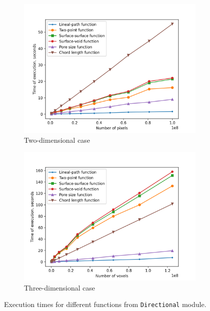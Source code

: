 \documentclass[reprint,amsmath,amssymb,aps,pre]{revtex4-1}
\newcommand{\code}[1]{\colorbox{light-gray}{\texttt{#1}}}
\begin{document}
\onecolumngrid
\begin{figure}[t]
  \centering
  \begin{subfigure}[b]{0.475\textwidth}
    \centering
    \includegraphics[width=\textwidth]{images/time-2d.png}
    \caption[]{{\small Two-dimensional case}}
    \label{fig:timings-2d}
  \end{subfigure}
  \hfill
  \begin{subfigure}[b]{0.475\textwidth}
    \centering
    \includegraphics[width=\textwidth]{images/time-3d.png}
    \caption[]{{\small Three-dimensional case}}
    \label{fig:timings-3d}
  \end{subfigure}
  \caption[]{\small Execution times for different functions from
    \code{Directional} module.}
  \label{fig:timings}
\end{figure}
\twocolumngrid
\end{document}
